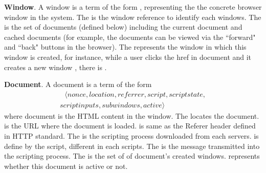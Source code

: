 \vspace{1mm}
\noindent\textbf{Window}. A window  is a term of the form , representing the  the concrete browser window in the system. The  is the window reference to identify each windows. The  is the set of documents (defined below) including the current document and cached documents (for example, the documents can be viewed via the ``forward" and ``back" buttons in the browser). The  represents the window in which this window is created, for instance, while a user clicks the href in document  and it creates a new window , there is .

\vspace{1mm}
\noindent\textbf{Document}. A document  is a term of the form
\begin{multline*}
  \ \ \ \langle nonce, location, referrer, script, scriptstate, \\
  scriptinputs, subwindows, active \rangle \ \ \
\end{multline*}
where document is the HTML content in the window.  The  locates the document.  is the URL where the document is loaded.  is same as the Referer header defined in HTTP standard. The  is the scripting process downloaded from each servers.  is define by the script, different in each scripts. The  is the message transmitted into the scripting process. The  is the set of  of document's created windows.  represents whether this document is active or not.


